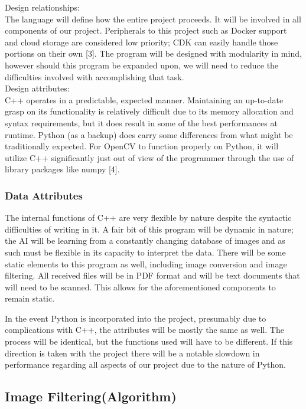 \documentclass[onecolumn, draftclsnofoot,10pt, compsoc]{IEEEtran}
\begin{document}
		Design relationships:\\
The language will define how the entire project proceeds. It will be involved in all components of our project. Peripherals to this project such as Docker support and cloud storage are considered low priority; CDK can easily handle those portions on their own [3]. The program will be designed with modularity in mind, however should this program be expanded upon, we will need to reduce the difficulties involved with accomplishing that task.\\

		Design attributes:\\
C++ operates in a predictable, expected manner. Maintaining an up-to-date grasp on its functionality is relatively difficult due to its memory allocation and syntax requirements, but it does result in some of the best performances at runtime. Python (as a backup) does carry some differences from what might be traditionally expected. For OpenCV to function properly on Python, it will utilize C++ significantly just out of view of the programmer through the use of library packages like numpy [4]. 


\subsubsection{Data Attributes}
The internal functions of C++ are very flexible by nature despite the syntactic difficulties of writing in it. A fair bit of this program will be dynamic in nature; the AI will be learning from a constantly changing database of images and as such must be flexible in its capacity to interpret the data. There will be some static elements to this program as well, including image conversion and image filtering. All received files will be in PDF format and will be text documents that will need to be scanned. This allows for the aforementioned components to remain static. 

In the event Python is incorporated into the project, presumably due to complications with C++, the attributes will be mostly the same as well. The process will be identical, but the functions used will have to be different. If this direction is taken with the project there will be a notable slowdown in performance regarding all aspects of our project due to the nature of Python.

\subsection{Image Filtering(Algorithm)}
\end{document}
